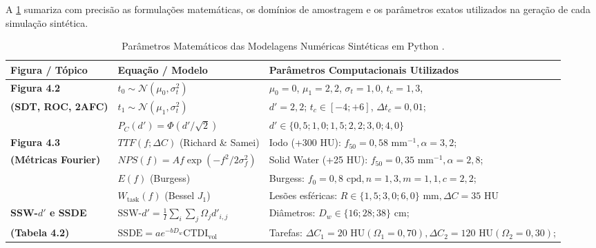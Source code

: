 \documentclass[
  12pt,
  a4paper,
  oneside
]{report}
\begin{document}
A \cref{tab:parametros_simulacao} sumariza com precisão as formulações matemáticas, os domínios de amostragem e os parâmetros exatos utilizados na geração de cada simulação sintética.

\begin{table}[htbp]
  \centering
  \small
  \caption[Parâmetros das Simulações Numéricas]{Parâmetros Matemáticos das Modelagens Numéricas Sintéticas em Python \cite{barrett_myers_2004, aapm_tg233_2019, burgess1999, deb2002, fitton2026, aapm_report204}.}
  \label{tab:parametros_simulacao}
  \renewcommand{\arraystretch}{1.25}
  \begin{tabularx}{\textwidth}{>{\RaggedRight\bfseries}p{} >{\RaggedRight}p{} >{\RaggedRight\arraybackslash}X}
    \toprule
    \textbf{Figura / Tópico} & \textbf{Equação / Modelo} & \textbf{Parâmetros Computacionais Utilizados} \\
    \midrule
    Figura 4.2 & $t_0 \sim \mathcal{N}(\mu_0, \sigma_t^2)$ \cite{metz1986} & $\mu_0 = 0$, $\mu_1 = 2{,}2$, $\sigma_t = 1{,}0$, $t_c = 1{,}3$, \\
    (SDT, ROC, 2AFC) & $t_1 \sim \mathcal{N}(\mu_1, \sigma_t^2)$ \cite{barrett_myers_2004} & $d' = 2{,}2$; $t_c \in [-4; +6]$, $\Delta t_c = 0{,}01$; \\
    & $P_C(d') = \Phi(d'/\sqrt{2})$ \cite{burgess1999} & $d' \in \{0{,}5; 1{,}0; 1{,}5; 2{,}2; 3{,}0; 4{,}0\}$ \\
    \addlinespace[0.4em]
    Figura 4.3 & $TTF(f; \Delta C)$ (Richard \& Samei) \cite{racine2020} & Iodo (+300 HU): $f_{50}=0{,}58\text{ mm}^{-1}, \alpha=3{,}2$; \\
    (Métricas Fourier) & $NPS(f) = A f \exp(-f^2/2\sigma_f^2)$ \cite{aapm_tg233_2019} & Solid Water (+25 HU): $f_{50}=0{,}35\text{ mm}^{-1}, \alpha=2{,}8$; \\
    & $E(f)$ (Burgess) \cite{burgess1999} & Burgess: $f_0=0{,}8\text{ cpd}, n=1{,}3, m=1{,}1, c=2{,}2$; \\
    & $W_{\text{task}}(f)$ (Bessel $J_1$) \cite{barrett_myers_2004} & Lesões esféricas: $R \in \{1{,}5; 3{,}0; 6{,}0\}\text{ mm}, \Delta C = 35\text{ HU}$ \\
    \addlinespace[0.4em]
    SSW-$d'$ e SSDE & $\text{SSW-}d' = \frac{1}{I} \sum_{i} \sum_{j} \Omega_j d'_{i,j}$ \cite{fitton2026} & Diâmetros: $D_w \in \{16; 28; 38\}\text{ cm}$; \\
    (Tabela 4.2) & $\text{SSDE} = a e^{-b D_w} \text{CTDI}_{\text{vol}}$ \cite{aapm_report204} & Tarefas: $\Delta C_1 = 20\text{ HU} (\Omega_1=0{,}70), \Delta C_2 = 120\text{ HU} (\Omega_2=0{,}30)$; \\

\end{tabularx}
\end{table}
\end{document}

